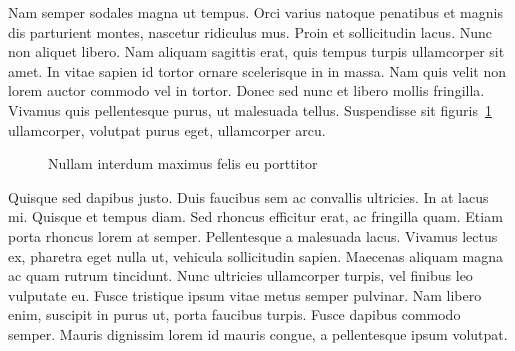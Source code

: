 \documentclass[polish,engineering]{wizthesis}
\begin{document}
Nam semper sodales magna ut tempus. Orci varius natoque penatibus et magnis dis
parturient montes, nascetur ridiculus mus. Proin et sollicitudin lacus. Nunc non
aliquet libero. Nam aliquam sagittis erat, quis tempus turpis ullamcorper sit
amet. In vitae sapien id tortor ornare scelerisque in in massa. Nam quis velit
non lorem auctor commodo vel in tortor. Donec sed nunc et libero mollis
fringilla. Vivamus quis pellentesque purus, ut malesuada tellus. Suspendisse sit
figuris~\ref{fig:wykres} ullamcorper, volutpat purus eget, ullamcorper arcu.
\begin{figure}[ht]
  \centering
  
  \caption{Nullam interdum maximus felis eu porttitor}
  \label{fig:wykres}
\end{figure}
Quisque sed dapibus justo. Duis faucibus sem ac convallis ultricies. In at lacus
mi. Quisque et tempus diam. Sed rhoncus efficitur erat, ac fringilla quam. Etiam
porta rhoncus lorem at semper. Pellentesque a malesuada lacus. Vivamus lectus
ex, pharetra eget nulla ut, vehicula sollicitudin sapien. Maecenas aliquam magna
ac quam rutrum tincidunt. Nunc ultricies ullamcorper turpis, vel finibus leo
vulputate eu. Fusce tristique ipsum vitae metus semper pulvinar. Nam libero
enim, suscipit in purus ut, porta faucibus turpis. Fusce dapibus commodo semper.
Mauris dignissim lorem id mauris congue, a pellentesque ipsum volutpat.
\end{document}
